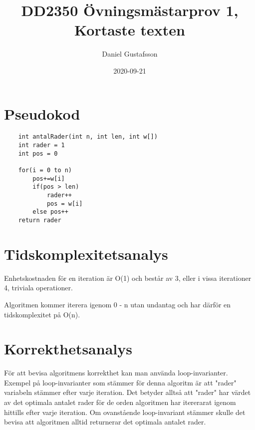 \documentclass[11pt]{article}
\title{DD2350 Övningsmästarprov 1, Kortaste texten}
\date{2020-09-21}
\author{Daniel Gustafsson}
\begin{document}
\maketitle
\newpage

\section{Pseudokod}
\begin{lstlisting}
    int antalRader(int n, int len, int w[])
    int rader = 1
    int pos = 0

    for(i = 0 to n)
        pos+=w[i]
        if(pos > len)
            rader++
            pos = w[i]
        else pos++
    return rader
\end{lstlisting}
\section{Tidskomplexitetsanalys}
Enhetskostnaden för en iteration är O(1) och består av 3,
eller i vissa iterationer 4, triviala operationer.

Algoritmen kommer iterera igenom 0 - n utan undantag och 
har därför en tidskomplexitet på O(n).
\section{Korrekthetsanalys}
För att bevisa algoritmens korrekthet kan man använda
loop-invarianter. Exempel på loop-invarianter som stämmer
för denna algoritm är att "rader" variabeln stämmer
efter varje iteration. Det betyder alltså att "rader" har
värdet av det optimala antalet rader för de orden 
algoritmen har itererarat igenom hittills efter varje 
iteration.
Om ovanstående loop-invariant stämmer skulle det bevisa
att algoritmen alltid returnerar det optimala antalet rader.
\end{document}
